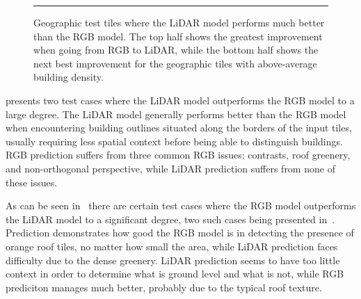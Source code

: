 \begin{figure}[H]
  \centering
  \rule[1ex]{\textwidth}{.5pt}
  \caption{%
    Geographic test tiles where the LiDAR model performs much better than the RGB model.
    The top half shows the greatest improvement when going from RGB to LiDAR, while the bottom half shows the next best improvement for the geographic tiles with above-average building density.
  }%
  \label{fig:lidar-better-than-rgb}
\end{figure}

 presents two test cases where the LiDAR model outperforms the RGB model to a large degree.  %
The LiDAR model generally performs better than the RGB model when encountering building outlines situated along the borders of the input tiles, usually requiring less spatial context before being able to distinguish buildings.
RGB prediction  suffers from three common RGB issues: contrasts, roof greenery, and non-orthogonal perspective, while LiDAR prediction  suffers from none of these issues.

As can be seen in~ there are certain test cases where the RGB model outperforms the LiDAR model to a significant degree, two such cases being presented in~.
Prediction  demonstrates how good the RGB model is in detecting the presence of orange roof tiles, no matter how small the area, while LiDAR prediction  faces difficulty due to the dense greenery.
LiDAR prediction  seems to have too little context in order to determine what is ground level and what is not, while RGB prediciton  manages much better, probably due to the typical roof texture.

